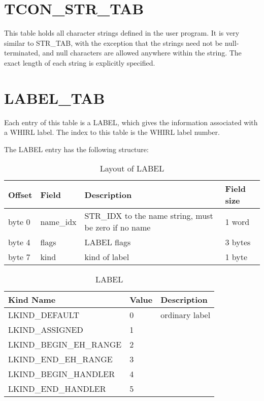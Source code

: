 \section{TCON\_STR\_TAB}

This table holds all character strings defined in the user program. It
is very similar to STR\_TAB, with the exception that the strings need not
be null-terminated, and null characters are allowed anywhere within the
string. The exact length of each string is explicitly specified.

\section{LABEL\_TAB}

Each entry of this table is a LABEL, which gives the information associated with a WHIRL label. The index to this table is the WHIRL label number.

The
%
LABEL entry has the following structure:

\begin{table}[h]
\centering
\caption{Layout of LABEL}
\label{table33} 
\begin{tabular}{|l|l|l|l|}\hline
Offset & Field & Description & Field size \\\hline\hline
byte 0 & name\_idx &
\index{STR\_IDX}%
STR\_IDX to the name string, must be zero if no
name & 1 word\\\hline
byte 4 & flags &
\index{LABEL}%
LABEL flags & 3 bytes \\\hline
byte 7 & kind & kind of label & 1 byte\\\hline
\end{tabular}
\end{table}

\begin{table}[h]
\centering
\caption{LABEL} 
\label{table34} 
\begin{tabular}{|l|l|l|}\hline
Kind Name & Value & Description \\\hline\hline
\index{LKIND\_DEFAULT}%
LKIND\_DEFAULT & 0 & ordinary label \\\hline
\index{LKIND\_ASSIGNED}%
LKIND\_ASSIGNED & 1 &\\\hline
\index{LKIND\_BEGIN\_EH\_RANGE}%
LKIND\_BEGIN\_EH\_RANGE & 2 &\\\hline
\index{LKIND\_END\_EH\_RANGE}%
LKIND\_END\_EH\_RANGE &3 &\\\hline
\index{LKIND\_BEGIN\_HANDLER}%
LKIND\_BEGIN\_HANDLER &4 &\\\hline
\index{LKIND\_END\_HANDLER}%
LKIND\_END\_HANDLER &5&\\\hline
\end{tabular}
\end{table}

